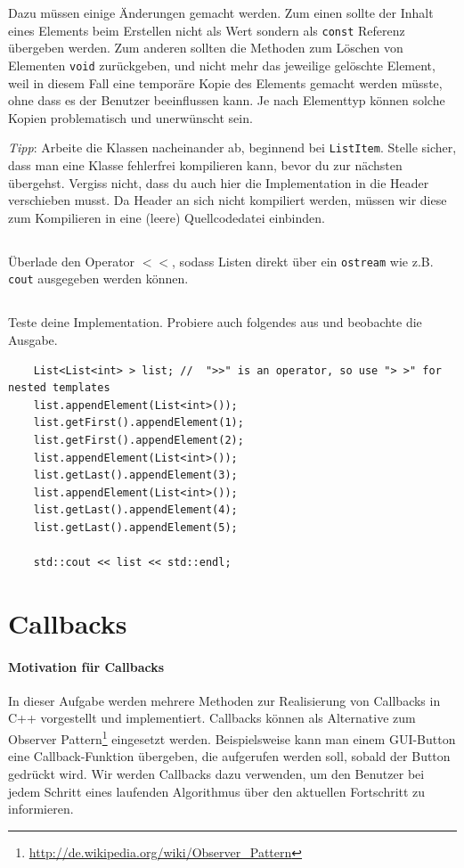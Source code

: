 Dazu müssen einige Änderungen gemacht werden.
Zum einen sollte der Inhalt eines Elements beim Erstellen nicht als Wert sondern als \texttt{const} Referenz übergeben werden.
Zum anderen sollten die Methoden zum Löschen von Elementen \texttt{void} zurückgeben, und nicht mehr das jeweilige gelöschte Element, weil in diesem Fall eine temporäre Kopie des Elements gemacht werden müsste, ohne dass es der Benutzer beeinflussen kann.
Je nach Elementtyp können solche Kopien problematisch und unerwünscht sein.

\emph{Tipp}: Arbeite die Klassen nacheinander ab, beginnend bei \texttt{ListItem}.
Stelle sicher, dass man eine Klasse fehlerfrei kompilieren kann, bevor du zur nächsten übergehst.
Vergiss nicht, dass du auch hier die Implementation in die Header verschieben musst.
Da Header an sich nicht kompiliert werden, müssen wir diese zum Kompilieren in eine (leere) Quellcodedatei einbinden.

\subsection{}
Überlade den Operator $<<$, sodass Listen direkt über ein \texttt{ostream} wie z.B. \texttt{cout} ausgegeben werden können.

\subsection{}
Teste deine Implementation. Probiere auch folgendes aus und beobachte die Ausgabe.

\begin{lstlisting}
	List<List<int> > list; //  ">>" is an operator, so use "> >" for nested templates
	list.appendElement(List<int>());
	list.getFirst().appendElement(1);
	list.getFirst().appendElement(2);
	list.appendElement(List<int>());
	list.getLast().appendElement(3);
	list.appendElement(List<int>());
	list.getLast().appendElement(4);
	list.getLast().appendElement(5);
	
	std::cout << list << std::endl;
\end{lstlisting}



\newpage

\section{Callbacks}

\paragraph*{Motivation für Callbacks}
In dieser Aufgabe werden mehrere Methoden zur Realisierung von Callbacks in C++ vorgestellt und implementiert.
Callbacks können als Alternative zum Observer Pattern\footnote{\url{http://de.wikipedia.org/wiki/Observer_Pattern}} eingesetzt werden.
Beispielsweise kann man einem GUI-Button eine Callback-Funktion übergeben, die aufgerufen werden soll, sobald der Button gedrückt wird.
Wir werden Callbacks dazu verwenden, um den Benutzer bei jedem Schritt eines laufenden Algorithmus über den aktuellen Fortschritt zu informieren.

